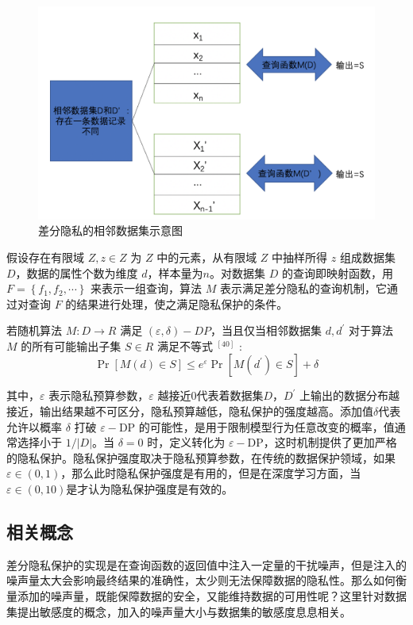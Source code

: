 \begin{figure}[!hbt]
\centering
	\includegraphics[scale=0.6]{fig2/C2/相邻数据集示意图}%
	\caption{差分隐私的相邻数据集示意图}
	\label{fig:相邻数据集示意图}	
\end{figure}

假设存在有限域 $Z,z \in Z$ 为 $Z$ 中的元素，从有限域 $Z$ 中抽样所得 $z$ 组成数据集 $D$，数据的属性个数为维度 $d$，样本量为$n$。对数据集 $D$ 的查询即映射函数，用 $F=\left\{f_{1}, f_{2}, \cdots\right\}$ 来表示一组查询，算法 $M$ 表示满足差分隐私的查询机制，它通过对查询 $F$ 的结果进行处理，使之满足隐私保护的条件。

\begin{define}[差分隐私成立条件]\label{差分隐私成立条件}

若随机算法 $M: D \rightarrow R$ 满足 $(\varepsilon, \delta)-D P$，当且仅当相邻数据集 $d, d^{\prime}$ 对于算法 $M$ 的所有可能输出子集 $S \in R$ 满足不等式 $^{[40]}$ :
$$
\operatorname{Pr}[M(d) \in S] \leq e^{\varepsilon} \operatorname{Pr}\left[M\left(d^{\prime}\right) \in S\right]+\delta
$$
\end{define}
其中，$\varepsilon$ 表示隐私预算参数，$\varepsilon$ 越接近0代表着数据集$D$，$D^{\prime}$ 上输出的数据分布越接近，输出结果越不可区分，隐私预算越低，隐私保护的强度越高。添加值$\delta$代表允许以概率 $\delta$ 打破 $\varepsilon-\mathrm{DP}$ 的可能性，是用于限制模型行为任意改变的概率，值通常选择小于 $1 /|D|$。当 $\delta=0$ 时，定义转化为 $\varepsilon-\mathrm{DP}$，这时机制提供了更加严格的隐私保护。隐私保护强度取决于隐私预算参数，在传统的数据保护领域，如果$\varepsilon \in(0,1)$，那么此时隐私保护强度是有用的，但是在深度学习方面，当$\varepsilon \in(0,10)$是才认为隐私保护强度是有效的。


\subsection{相关概念}
差分隐私保护的实现是在查询函数的返回值中注入一定量的干扰噪声，但是注入的噪声量太大会影响最终结果的准确性，太少则无法保障数据的隐私性。那么如何衡量添加的噪声量，既能保障数据的安全，又能维持数据的可用性呢？这里针对数据集提出敏感度的概念，加入的噪声量大小与数据集的敏感度息息相关。

